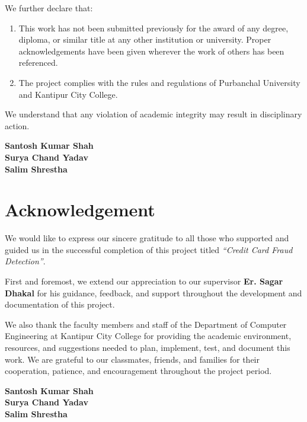 \documentclass[12pt,a4paper]{report}
\newcommand{\projecttitle}{Credit Card Fraud Detection}
\newcommand{\supervisor}{Er. Sagar Dhakal}
\newcommand{\department}{Department of Computer Engineering}
\newcommand{\college}{Kantipur City College}
\begin{document}
We further declare that:
\begin{enumerate}
    \item This work has not been submitted previously for the award of any degree, diploma, or similar title at any other institution or university. Proper acknowledgements have been given wherever the work of others has been referenced.
    \item The project complies with the rules and regulations of Purbanchal University and \college.
\end{enumerate}

We understand that any violation of academic integrity may result in disciplinary action.


\vspace{1cm}
\begin{flushright}
\textbf{Santosh Kumar Shah}\\
\textbf{Surya Chand Yadav}\\
\textbf{Salim Shrestha}
\end{flushright}

\newpage

\chapter*{Acknowledgement}

We would like to express our sincere gratitude to all those who supported and guided us in the successful completion of this project titled \textit{``\projecttitle''}.

First and foremost, we extend our appreciation to our supervisor \textbf{\supervisor} for his guidance, feedback, and support throughout the development and documentation of this project.

We also thank the faculty members and staff of the \department{} at \college{} for providing the academic environment, resources, and suggestions needed to plan, implement, test, and document this work. We are grateful to our classmates, friends, and families for their cooperation, patience, and encouragement throughout the project period.

\vspace{1cm}
\begin{flushright}
\textbf{Santosh Kumar Shah}\\
\textbf{Surya Chand Yadav}\\
\textbf{Salim Shrestha}
\end{flushright}
\end{document}
